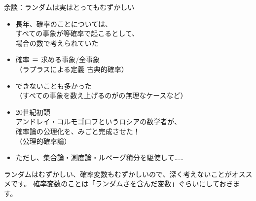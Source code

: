 \documentclass[dvipdfmx,cjk]{beamer}
\begin{document}
\begin{frame}{余談：ランダムは実はとってもむずかしい} \pause


\begin{itemize}
    \item 長年、確率のことについては、\\
    すべての事象が等確率で起こるとして、\\
    場合の数で考えられていた \pause
    \item 確率 ＝ 求める事象/全事象 \\
    （ラプラスによる定義 古典的確率） \pause
    \item できないことも多かった \\
    （すべての事象を数え上げるのがの無理なケースなど） \pause

    \item 20世紀初頭 \\ \pause
    アンドレイ・コルモゴロフというロシアの数学者が、 \\
    確率論の公理化を、みごと完成させた！\\
    （公理的確率論） \pause

    \item ただし、集合論・測度論・ルベーグ積分を駆使して……  \pause
\end{itemize}






\vskip 0.3cm

ランダムはむずかしい、確率変数もむずかしいので、深く考えないことがオススメです。
確率変数のことは「ランダムさを含んだ変数」ぐらいにしておきます。


\end{frame}
\end{document}
